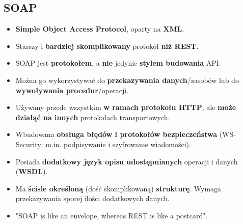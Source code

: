 \documentclass[../main.tex]{subfiles}
\begin{document}
    \subsection{SOAP}
    \begin{itemize}
        \item \textbf{Simple Object Access Protocol}, oparty na \textbf{XML}.
        \item Starszy i \textbf{bardziej skomplikowany} protokół \textbf{niż REST}.
        \item SOAP jest \textbf{protokołem}, a \textbf{nie} jedynie \textbf{stylem budowania} API.
        \item Można go wykorzystywać do \textbf{przekazywania danych}/zasobów lub do \textbf{wywoływania procedur}/operacji.
        \item Używany przede wszystkim \textbf{w ramach protokołu HTTP}, ale \textbf{może działąć na innych} protokołach
        transportowych.
        \item Wbudowana \textbf{obsługa błędów i protokołów bezpieczeństwa} (WS-Security: m.in. podpisywanie i
        szyfrowanie wiadomości).
        \item Posiada \textbf{dodatkowy język opisu udostępnianych} operacji i danych (\textbf{WSDL}).
        \item Ma \textbf{ścisle określoną} (dość skomplikowaną) \textbf{strukturę}. Wymaga przekazywania
        sporej ilości dodatkowych danych.
        \item "SOAP is like an envelope, whereas REST is like a postcard".
    \end{itemize}
\end{document}
